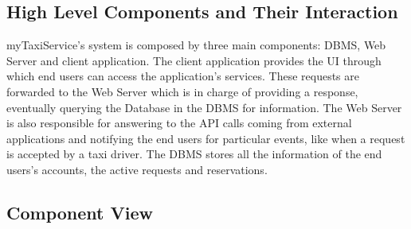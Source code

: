 \documentclass{article}
\begin{document}
\subsection{High Level Components and Their Interaction}
myTaxiService's system is composed by three main components: DBMS, Web Server and client application. The client application provides the UI through which end users can access the application's services. These requests are forwarded to the Web Server which is in charge of providing a response, eventually querying the Database in the DBMS for information. The Web Server is also responsible for answering to the API calls coming from external applications and notifying the end users for particular events, like when a request is accepted by a taxi driver. The DBMS stores all the information of the end users's accounts, the active requests and reservations.

\subsection{Component View}
\begin{figure}[H]
\end{figure}
\end{document}
